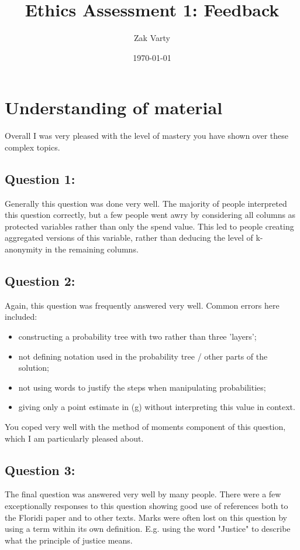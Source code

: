 \documentclass[a4paper, 11pt]{article}
\title{Ethics Assessment 1: Feedback}
\author{Zak Varty}
\date{\today}
\begin{document}
\maketitle

\section{Understanding of material }

Overall I was very pleased with the level of mastery you have shown over these complex topics. 

\subsection*{Question 1:}

Generally this question was done very well. The majority of people interpreted this question correctly, but a few people went awry by considering all columns as protected variables rather than only the spend value. This led to people creating aggregated versions of this variable, rather than deducing the level of k-anonymity in the remaining columns. 

\subsection*{Question 2:}

Again, this question was frequently answered very well. Common errors here included: 
\begin{itemize}
    \item constructing a probability tree with two rather than three 'layers';
    \item not defining notation used in the probability tree / other parts of the solution;  
    \item not using words to justify the steps when manipulating probabilities;
    \item giving only a point estimate in (g) without interpreting this value in context.
\end{itemize}


You coped very well with the method of moments component of this question, which I am particularly pleased about.  

 \subsection*{Question 3:}  
The final question was answered very well by many people. There were a few exceptionally responses to this question showing good use of references both to the Floridi paper and to other texts. 
Marks were often lost on this question by using a term within its own definition. E.g. using the word "Justice" to describe what the principle of justice means.
\end{document}
